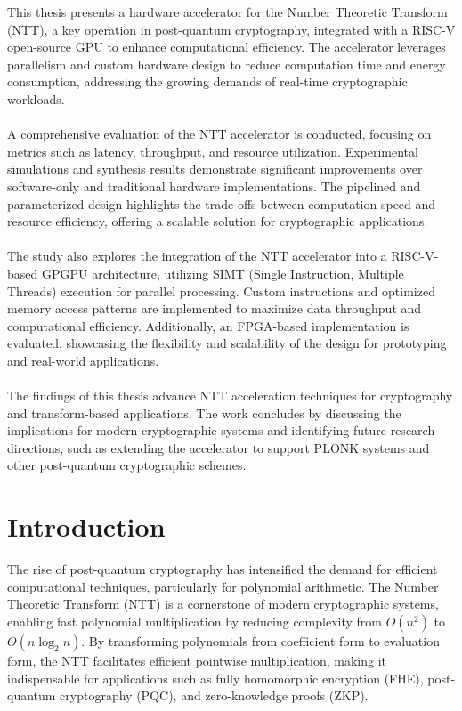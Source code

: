 \documentclass[12pt]{report}
\begin{document}
This thesis presents a hardware accelerator for the Number Theoretic Transform (NTT), a key operation in post-quantum cryptography, integrated with a RISC-V open-source GPU to enhance computational efficiency. The accelerator leverages parallelism and custom hardware design to reduce computation time and energy consumption, addressing the growing demands of real-time cryptographic workloads. \\ \\
A comprehensive evaluation of the NTT accelerator is conducted, focusing on metrics such as latency, throughput, and resource utilization. Experimental simulations and synthesis results demonstrate significant improvements over software-only and traditional hardware implementations. The pipelined and parameterized design highlights the trade-offs between computation speed and resource efficiency, offering a scalable solution for cryptographic applications. \\ \\
The study also explores the integration of the NTT accelerator into a RISC-V-based GPGPU architecture, utilizing SIMT (Single Instruction, Multiple Threads) execution for parallel processing. Custom instructions and optimized memory access patterns are implemented to maximize data throughput and computational efficiency. Additionally, an FPGA-based implementation is evaluated, showcasing the flexibility and scalability of the design for prototyping and real-world applications. \\ \\
The findings of this thesis advance NTT acceleration techniques for cryptography and transform-based applications. The work concludes by discussing the implications for modern cryptographic systems and identifying future research directions, such as extending the accelerator to support PLONK systems and other post-quantum cryptographic schemes.

\newpage

\tableofcontents
\listoffigures
\listoftables

\newpage

\chapter{Introduction}

The rise of post-quantum cryptography has intensified the demand for efficient computational techniques, particularly for polynomial arithmetic. The Number Theoretic Transform (NTT) is a cornerstone of modern cryptographic systems, enabling fast polynomial multiplication by reducing complexity from $O(n^2)$ to $O(n \log_2 n)$. By transforming polynomials from coefficient form to evaluation form, the NTT facilitates efficient pointwise multiplication, making it indispensable for applications such as fully homomorphic encryption (FHE), post-quantum cryptography (PQC), and zero-knowledge proofs (ZKP).
\end{document}
